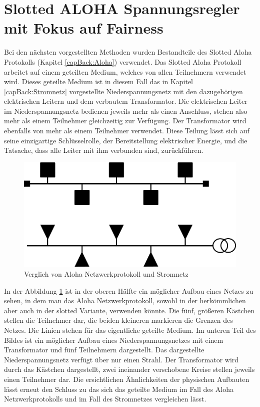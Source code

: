 \section{Slotted ALOHA Spannungsregler mit Fokus auf Fairness}
Bei den nächsten vorgestellten Methoden wurden Bestandteile des Slotted Aloha Protokolls (Kapitel \ref{capBack:Aloha}) verwendet. Das Slotted Aloha Protokoll arbeitet auf einem geteilten Medium, welches von allen Teilnehmern verwendet wird. Dieses geteilte Medium ist in diesem Fall das in Kapitel \ref{capBack:Stromnetz} vorgestellte Niederspannungsnetz mit den dazugehörigen elektrischen Leitern und dem verbautem Transformator. Die elektrischen Leiter im Niederspannungsnetz bedienen jeweils mehr als einen Anschluss, stehen also mehr als einem Teilnehmer gleichzeitig zur Verfügung. Der Transformator wird ebenfalls von mehr als einem Teilnehmer verwendet. Diese Teilung lässt sich auf seine einzigartige Schlüsselrolle, der Bereitstellung elektrischer Energie, und die Tatsache, dass alle Leiter mit ihm verbunden sind, zurückführen.\\
\begin{figure}[htb]
	\centering
	\includegraphics[scale=0.75]{img/sharedMedium3.png}
	\caption{Verglich von Aloha Netzwerkprotokoll und Stromnetz}
	\label{Abb_sharedmedium}
\end{figure}
In der Abbildung \ref{Abb_sharedmedium} ist in der oberen Hälfte ein möglicher Aufbau eines Netzes zu sehen, in dem man das Aloha Netzwerkprotokoll, sowohl in der herkömmlichen aber auch in der slotted Variante, verwenden könnte. Die fünf, größeren Kästchen stellen die Teilnehmer dar, die beiden kleineren markieren die Grenzen des Netzes. Die Linien stehen für das eigentliche geteilte Medium. Im unteren Teil des Bildes ist ein möglicher Aufbau eines Niederspannungsnetzes mit einem Transformator und fünf Teilnehmern dargestellt. Das dargestellte Niederspannungsnetz verfügt über nur einen Strahl. Der Transformator wird durch das Kästchen dargestellt, zwei ineinander verschobene Kreise stellen jeweils einen Teilnehmer dar. Die ersichtlichen Ähnlichkeiten der physischen Aufbauten lässt erneut den Schluss zu das sich das geteilte Medium im Fall des Aloha Netzwerkprotokolls und im Fall des Stromnetzes vergleichen lässt.\\
